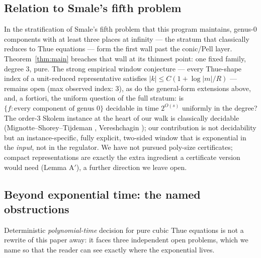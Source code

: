 \documentclass[11pt]{amsart}
\theoremstyle{plain}
\theoremstyle{remark}
\begin{document}
\subsection{Relation to Smale's fifth problem}\label{rem:smale}

In the stratification of Smale's fifth problem that this program
maintains, genus-0 components with at least three places at infinity
--- the stratum that classically reduces to Thue equations --- form
the first wall past the conic/Pell layer. Theorem~\ref{thm:main}
breaches that wall at its thinnest point: one fixed family, degree 3,
pure. The strong empirical window conjecture --- every Thue-shape
index of a unit-reduced representative satisfies
$|k| \le C(1 + \log|m|/R)$ --- remains open (max observed index: 3),
as do the general-form extensions above, and, a fortiori, the uniform
question of the full stratum: is
$\{f : \text{every component of genus } 0\}$ decidable in time
$2^{O(s)}$ uniformly in the degree? The order-3 Skolem instance at
the heart of our walk is classically decidable
(Mignotte--Shorey--Tijdeman \cite{MST84}, Vereshchagin \cite{Ver85});
our contribution is not decidability but an instance-specific, fully
explicit, two-sided window that is exponential in the \emph{input},
not in the regulator. We have not pursued poly-size certificates;
compact representations are exactly the extra ingredient a
certificate version would need (Lemma A$'$), a further direction we
leave open.

\subsection{Beyond exponential time: the named obstructions}
\label{rem:beyond}

Deterministic \emph{polynomial-time} decision for pure cubic Thue
equations is not a rewrite of this paper away: it faces three
independent open problems, which we name so that the reader can see
exactly where the exponential lives.
\end{document}
